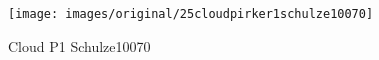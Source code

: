 \begin{figure}[!h] 
\centering 
\texttt{[image: images/original/25cloudpirker1schulze10070]}
\caption{Cloud P1 Schulze10070}
\label{fig:25cloudpirker1schulze10070} 
\end{figure}


